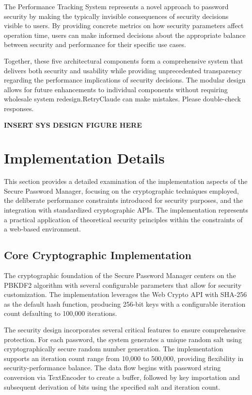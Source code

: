 \documentclass[11pt,a4paper]{article}
\begin{document}
The Performance Tracking System represents a novel approach to password security by making the typically invisible consequences of security decisions visible to users. By providing concrete metrics on how security parameters affect operation time, users can make informed decisions about the appropriate balance between security and performance for their specific use cases.

Together, these five architectural components form a comprehensive system that delivers both security and usability while providing unprecedented transparency regarding the performance implications of security decisions. The modular design allows for future enhancements to individual components without requiring wholesale system redesign.RetryClaude can make mistakes. Please double-check responses.

\textbf{INSERT SYS DESIGN FIGURE HERE}
\section{Implementation Details}
This section provides a detailed examination of the implementation aspects of the Secure Password Manager, focusing on the cryptographic techniques employed, the deliberate performance constraints introduced for security purposes, and the integration with standardized cryptographic APIs. The implementation represents a practical application of theoretical security principles within the constraints of a web-based environment.
\subsection{Core Cryptographic Implementation}
The cryptographic foundation of the Secure Password Manager centers on the PBKDF2 algorithm with several configurable parameters that allow for security customization. The implementation leverages the Web Crypto API with SHA-256 as the default hash function, producing 256-bit keys with a configurable iteration count defaulting to 100,000 iterations.


The security design incorporates several critical features to ensure comprehensive protection. For each password, the system generates a unique random salt using cryptographically secure random number generation. The implementation supports an iteration count range from 10,000 to 500,000, providing flexibility in security-performance balance. The data flow begins with password string conversion via TextEncoder to create a buffer, followed by key importation and subsequent derivation of bits using the specified salt and iteration count.
\end{document}
